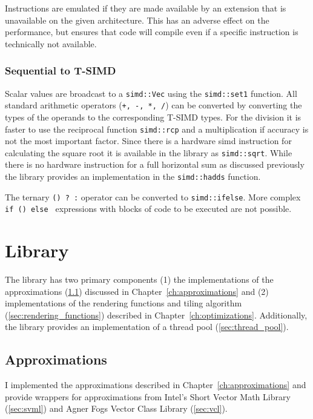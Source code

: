 \documentclass[a4paper, 11pt]{memoir}
\begin{document}
    Instructions are emulated if they are made available by an extension that is unavailable on the given architecture.
    This has an adverse effect on the performance, but ensures that code will compile even if a specific instruction
    is technically not available.

    \subsubsection{Sequential to T-SIMD}
    \label{sec:seq_to_tsimd}

    Scalar values are broadcast to a \texttt{simd::Vec} using the \texttt{simd::set1} function. All
    standard arithmetic operators (\texttt{+, -, *, /}) can be converted by converting the types of the
    operands to the corresponding T-SIMD types. For the division it is faster to use the reciprocal function
    \texttt{simd::rcp} and a multiplication if accuracy is not the most important factor. Since there is a
    hardware \gls{simd} instruction for calculating the square root it is available in the library as
    \texttt{simd::sqrt}. While there is no hardware instruction for a full horizontal sum as discussed previously
    the library provides an implementation in the \texttt{simd::hadds} function.

    The ternary \texttt{() ? :} operator can be converted to \texttt{simd::ifelse}. More complex
    \texttt{if () {} else {}} expressions with blocks of code
    to be executed are not possible.

    \section{Library}
    \label{sec:library}
    The library has two primary components (1) the implementations of the approximations (\ref{sec:impl_approx})
    discussed in Chapter~\ref{ch:approximations} and (2) implementations of the rendering functions and tiling
    algorithm (\ref{sec:rendering_functions}) described in Chapter~\ref{ch:optimizations}. Additionally, the library
    provides an implementation of a thread pool (\ref{sec:thread_pool}).

    \subsection{Approximations}
    \label{sec:impl_approx}
    I implemented the approximations described in Chapter~\ref{ch:approximations} and provide wrappers for
    approximations from Intel's Short Vector Math Library (\ref{sec:svml}) and Agner Fogs Vector Class Library
    (\ref{sec:vcl}).
\end{document}
